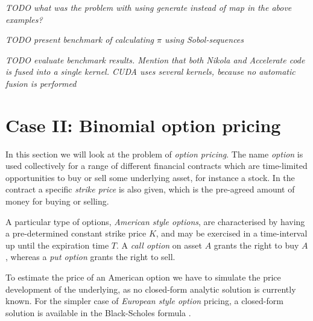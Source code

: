 \documentclass{llncs2e/llncs}
\begin{document}
\emph{TODO what was the problem with using generate instead of map in the
above examples?}

\emph{TODO present benchmark of calculating $\pi$ using Sobol-sequences}

\emph{TODO evaluate benchmark results. Mention that both Nikola and
  Accelerate code is fused into a single kernel. CUDA uses several
  kernels, because no automatic fusion is performed}


\section{Case II: Binomial option pricing}
In this section we will look at the problem of \emph{option
  pricing}. The name \emph{option} is used collectively for a range of
different financial contracts which are time-limited opportunities to
buy or sell some underlying asset, for instance a stock. In the
contract a specific \emph{strike price} is also given, which is the
pre-agreed amount of money for buying or selling.

A particular type of options, \emph{American style options}, are
characterised by having a pre-determined constant strike price $K$,
and may be exercised in a time-interval up until the expiration time
$T$. A \emph{call option} on asset $A$ grants the right to buy $A$,
whereas a \emph{put option} grants the right to sell.

To estimate the price of an American option we have to simulate the
price development of the underlying, as no closed-form analytic
solution is currently known. For the simpler case of \emph{European
  style option} pricing, a closed-form solution is available in the
Black-Scholes formula \cite{black1973pricing}.
\end{document}
